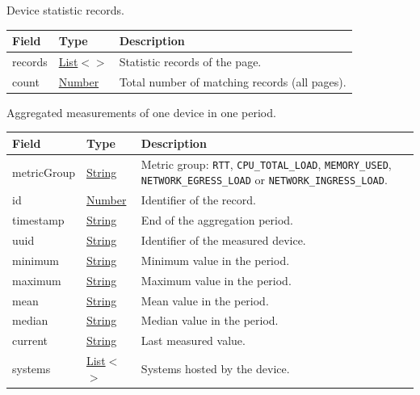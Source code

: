 \documentclass[a4paper]{arrowhead}
\newcommand{\mref}[2][]{{\textcolor{ArrowheadPurple}{\hyperref[sec:model:#2]{\ifstrempty{#1}{#2}{#1}}}}}
\newcommand{\pref}[1]{{\textcolor{ArrowheadGrey}{\hyperref[sec:model:primitives:#1]{#1}}}}
\begin{document}
Device statistic records.


\noindent\begin{tabularx}{\textwidth}{| >{\raggedright\arraybackslash}p{3.9cm} | >{\raggedright\arraybackslash\small}p{5.3cm} | X |} \hline
\rowcolor{gray!33} Field & Type & Description \\ \hline
records & \pref{List}$<$\allowbreak{}\mref{QoSDeviceStatRecord}$>$ & Statistic records of the page. \\ \hline
count & \pref{Number} & Total number of matching records (all pages). \\ \hline
\end{tabularx}




Aggregated measurements of one device in one period.


\noindent\begin{tabularx}{\textwidth}{| >{\raggedright\arraybackslash}p{3.9cm} | >{\raggedright\arraybackslash\small}p{5.3cm} | X |} \hline
\rowcolor{gray!33} Field & Type & Description \\ \hline
metric\allowbreak{}Group & \pref{String} & Metric group: \texttt{RTT}, \texttt{CPU\_\allowbreak{}TOTAL\_\allowbreak{}LOAD}, \texttt{MEMORY\_\allowbreak{}USED}, \texttt{NETWORK\_\allowbreak{}EGRESS\_\allowbreak{}LOAD} or \texttt{NETWORK\_\allowbreak{}INGRESS\_\allowbreak{}LOAD}. \\ \hline
id & \pref{Number} & Identifier of the record. \\ \hline
timestamp & \pref{String} & End of the aggregation period. \\ \hline
uuid & \pref{String} & Identifier of the measured device. \\ \hline
minimum & \pref{String} & Minimum value in the period. \\ \hline
maximum & \pref{String} & Maximum value in the period. \\ \hline
mean & \pref{String} & Mean value in the period. \\ \hline
median & \pref{String} & Median value in the period. \\ \hline
current & \pref{String} & Last measured value. \\ \hline
systems & \pref{List}$<$\allowbreak{}\pref{String}$>$ & Systems hosted by the device. \\ \hline
\end{tabularx}
\end{document}
